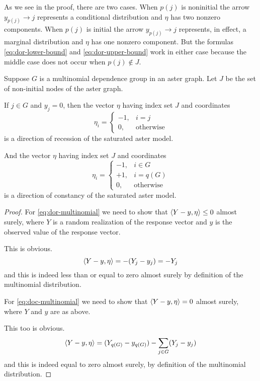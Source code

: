 As we see in the proof, there are two cases.  When $p(j)$ is noninitial
the arrow $y_{p(j)} \longrightarrow j$ represents a conditional
distribution and $\eta$ has two nonzero components.
When $p(j)$ is initial the arrow $y_{p(j)} \longrightarrow j$ represents,
in effect, a marginal distribution and $\eta$ has one nonzero component.
But the formulas \eqref{eq:dor-lower-bound} and \eqref{eq:dor-upper-bound}
work in either case because the middle case does not occur when
$p(j) \notin J$.

\begin{theorem} \label{th:dor-multinomial}
Suppose $G$ is a multinomial dependence group in an aster graph.
Let $J$ be the set of non-initial nodes of the aster graph.

If $j \in G$ and $y_j = 0$, then the vector $\eta$ having index set $J$
and coordinates
\begin{equation} \label{eq:dor-multinomial}
   \eta_i = \begin{cases} -1, & i = j \\
   0, & \text{otherwise} \end{cases}
\end{equation}
is a direction of recession of the saturated aster model.

And the vector $\eta$ having index set $J$ and coordinates
\begin{equation} \label{eq:doc-multinomial}
   \eta_i = \begin{cases} -1, & i \in G \\
   +1, & i = q(G) \\
   0, & \text{otherwise} \end{cases}
\end{equation}
is a direction of constancy of the saturated aster model.
\end{theorem}
\begin{proof}
For \eqref{eq:dor-multinomial} we need to show
that $\langle Y - y, \eta \rangle \le 0$ almost surely,
where $Y$ is a random realization of the response vector and $y$
is the observed value of the response vector.

This is obvious.
$$
   \langle Y - y, \eta \rangle = - (Y_j - y_j)
   =
   - Y_j
$$
and this is indeed less than or equal to zero almost surely
by definition of the multinomial distribution.

For \eqref{eq:doc-multinomial} we need to show
that $\langle Y - y, \eta \rangle = 0$ almost surely,
where $Y$ and $y$ are as above.

This too is obvious.
$$
   \langle Y - y, \eta \rangle = (Y_{q(G)} - y_{q(G)}) - \sum_{j \in G} (Y_j - y_j)
$$
and this is indeed equal to zero almost surely,
by definition of the multinomial distribution.
\end{proof}

